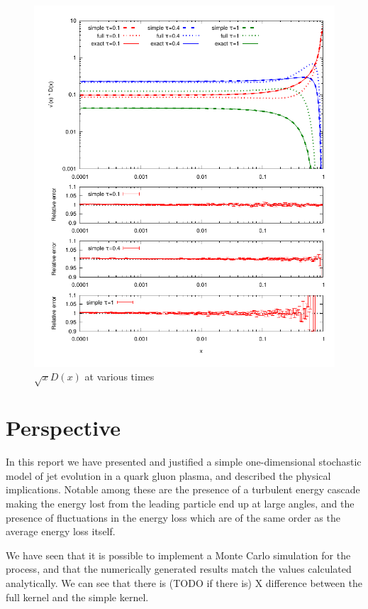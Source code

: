 \documentclass[a4paper,12pt]{article}
\numberwithin{equation}{section}
\begin{document}
\begin{figure}
\centering
\includegraphics[width=\linewidth]{times.pdf}
\caption{$\sqrt{x} D(x)$ at various times}\label{Dtimes}
\end{figure}

\section{Perspective}
In this report we have presented and justified a simple one-dimensional stochastic model of jet evolution in a quark gluon plasma, and described the physical implications. Notable among these are the presence of a turbulent energy cascade making the energy lost from the leading particle end up at large angles, and the presence of fluctuations in the energy loss which are of the same order as the average energy loss itself. 

We have seen that it is possible to implement a Monte Carlo simulation for the process, and that the numerically generated results match the values calculated analytically. We can see that there is (TODO if there is) X difference between the full kernel and the simple kernel.
\end{document}
